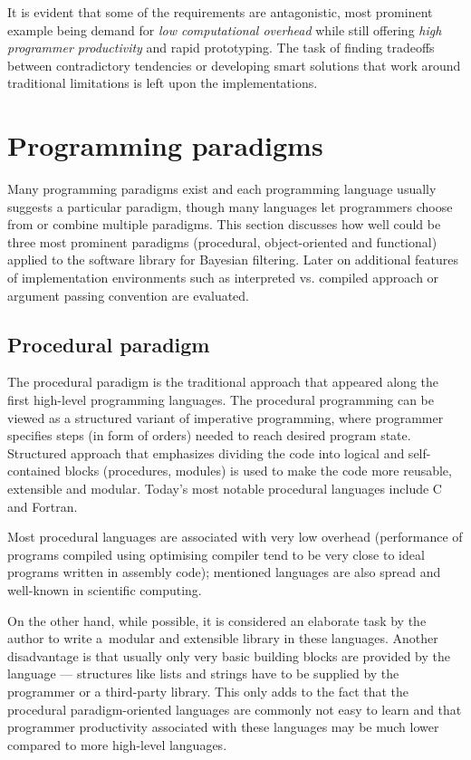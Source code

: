 It is evident that some of the requirements are antagonistic, most prominent example being demand
for \emph{low computational overhead} while still offering \emph{high programmer productivity} and
rapid prototyping. The task of finding tradeoffs between contradictory tendencies or developing smart
solutions that work around traditional limitations is left upon the implementations.

\section{Programming paradigms}

Many programming paradigms exist and each programming language usually suggests a particular paradigm,
though many languages let programmers choose from or combine multiple paradigms. This section
discusses how well could be three most prominent paradigms (procedural, object-oriented and
functional) applied to the software library for Bayesian filtering. Later on additional features of
implementation environments such as interpreted vs. compiled approach or argument passing convention
are evaluated.

\subsection{Procedural paradigm}

The procedural paradigm is the traditional approach that appeared along the first high-level programming languages.
The procedural programming can be viewed as a structured variant of imperative programming, where
programmer specifies steps (in form of orders) needed to reach desired program state.
Structured approach that emphasizes dividing the code into logical and self-contained
blocks (procedures, modules) is used to make the code more reusable, extensible and modular.
Today's most notable procedural languages include C and Fortran.

Most procedural languages are associated with very low overhead (performance of programs
compiled using optimising compiler tend to be very close to ideal programs written in
assembly code); mentioned languages are also spread and well-known in scientific computing.

On the other hand, while possible, it is considered an elaborate task by the author to write
a~modular and extensible library in these languages. Another disadvantage is that
usually only very basic building blocks are provided by the language --- structures like
lists and strings have to be supplied by the programmer or a third-party library. This only
adds to the fact that the procedural paradigm-oriented languages are commonly not easy to learn
and that programmer productivity associated with these languages may be much lower compared
to more high-level languages.

